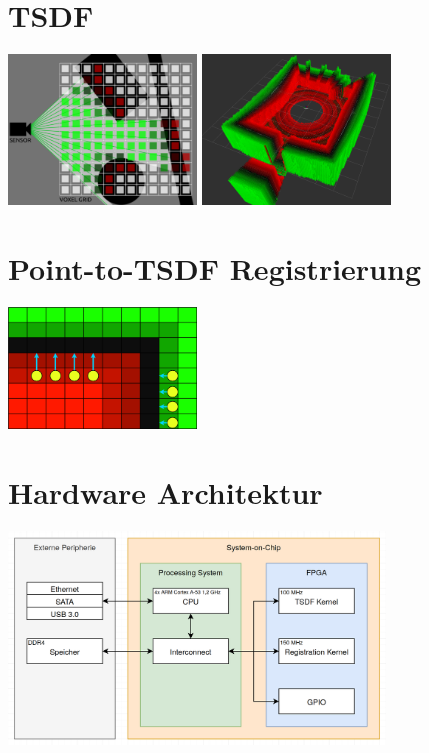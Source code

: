 \documentclass{beamer}
\begin{document}
\section{TSDF}
\begin{frame}{\secname}
\begin{center}
\includegraphics[width=5cm]{images/TSDF_Gen_new.png}
\includegraphics[width=5cm]{images/TSDF_3D.png}
\end{center}
\end{frame}

\section{Point-to-TSDF Registrierung}
\begin{frame}{\secname}
\begin{center}
\includegraphics[width=5cm]{images/Reg_Gradient.png}
\end{center}
\end{frame}

\section{Hardware Architektur}
\begin{frame}{\secname}
\begin{center}
\includegraphics[width=10cm]{images/HW_Architecture.png}
\end{center}
\end{frame}
\end{document}
